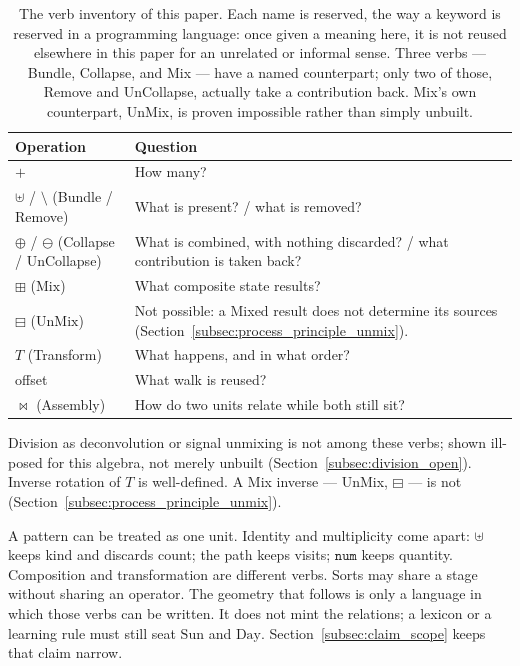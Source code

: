 \documentclass[12pt, a4paper]{article}
\begin{document}
\begin{table}[h]
\centering
\begin{tabular}{lp{7.2cm}}
\hline
Operation & Question \\
\hline
$+$ & How many? \\
$\uplus$ / $\setminus$ (Bundle / Remove) & What is present? / what is removed? \\
$\oplus$ / $\ominus$ (Collapse / UnCollapse) & What is combined, with nothing discarded? / what contribution is taken back? \\
$\boxplus$ ($\mathrm{Mix}$) & What composite state results? \\
$\boxminus$ ($\mathrm{UnMix}$) & Not possible: a Mixed result does not determine its sources (Section~\ref{subsec:process_principle_unmix}). \\
$T$ (Transform) & What happens, and in what order? \\
offset & What walk is reused? \\
$\bowtie$ (Assembly) & How do two units relate while both still sit? \\
\hline
\end{tabular}
\caption{The verb inventory of this paper. Each name is reserved,
the way a keyword is reserved in a programming language: once given
a meaning here, it is not reused elsewhere in this paper for an
unrelated or informal sense. Three verbs --- Bundle, Collapse, and
Mix --- have a named counterpart; only two of those, Remove and
UnCollapse, actually take a contribution back. Mix's own
counterpart, UnMix, is proven impossible rather than simply
unbuilt.}
\label{tab:verb_inventory}
\end{table}

Division as deconvolution or signal unmixing is not among these
verbs; shown ill-posed for this algebra, not merely unbuilt
(Section~\ref{subsec:division_open}).
Inverse rotation of $T$ is well-defined. A Mix inverse ---
UnMix, $\boxminus$ --- is not
(Section~\ref{subsec:process_principle_unmix}).

A pattern can be treated as one unit. Identity and multiplicity come
apart: $\uplus$ keeps kind and discards count; the path keeps visits;
$\mathtt{num}$ keeps quantity. Composition and transformation are
different verbs. Sorts may share a stage without sharing an operator.
The geometry that follows is only a language in which those verbs can
be written. It does not mint the relations; a lexicon or a learning
rule must still seat $\mathrm{Sun}$ and $\mathrm{Day}$.
Section~\ref{subsec:claim_scope} keeps that claim narrow.
\end{document}
